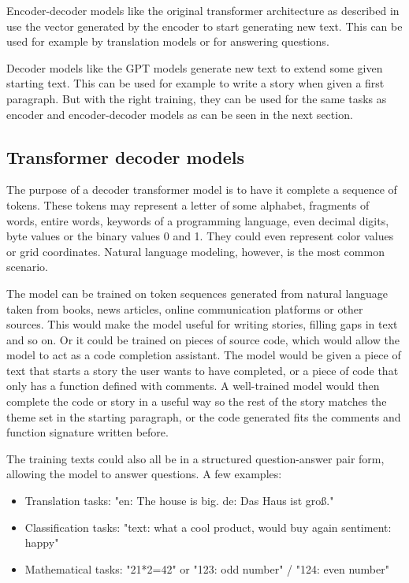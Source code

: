 Encoder-decoder models like the original transformer architecture as described in \cite{allyouneed} use the vector generated by the encoder to start generating new text. This can be used for example by translation models or for answering questions.

Decoder models like the GPT models \cite{improvinglu} generate new text to extend some given starting text. This can be used for example to write a story when given a first paragraph. But with the right training, they can be used for the same tasks as encoder and encoder-decoder models as can be seen in the next section.

\subsection{Transformer decoder models}

The purpose of a decoder transformer model is to have it complete a sequence of tokens. These tokens may represent a letter of some alphabet, fragments of words, entire words, keywords of a programming language, even decimal digits, byte values or the binary values 0 and 1.
They could even represent color values or grid coordinates. Natural language modeling, however, is the most common scenario.

The model can be trained on token sequences generated from natural language taken from books, news articles, online communication platforms or other sources. This would make the model useful for writing stories, filling gaps in text and so on.
Or it could be trained on pieces of source code, which would allow the model to act as a code completion assistant.
The model would be given a piece of text that starts a story the user wants to have completed, or a piece of code that only has a function defined with comments. A well-trained model would then complete the code or story in a useful way so the rest of the story matches the theme set in the starting paragraph, or the code generated fits the comments and function signature written before.

The training texts could also all be in a structured question-answer pair form, allowing the model to answer questions. A few examples:
\label{transformer:examples}

\begin{itemize}
\item Translation tasks: "en: The house is big.  de: Das Haus ist groß."
\item Classification tasks: "text:  what a cool product, would buy again  sentiment: happy"
\item Mathematical tasks: "21*2=42" or "123: odd number" / "124: even number" 
\end{itemize}

